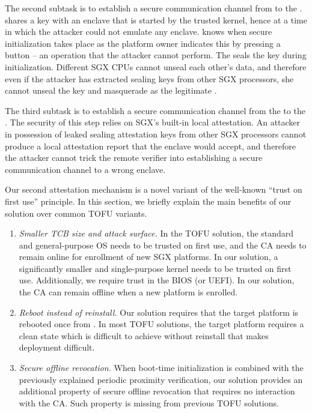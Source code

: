 The second subtask is to establish a secure communication channel from \device to the \nameclave. \device shares a key with an enclave that is started by the trusted \name kernel, hence at a time in which the attacker could not emulate any enclave. \device knows when secure initialization takes place as the platform owner indicates this by pressing a button -- an operation that the attacker cannot perform. The \nameclave seals the key during initialization. Different SGX CPUs cannot unseal each other's data, and therefore even if the attacker has extracted sealing keys from other SGX processors, she cannot unseal the key and masquerade as the legitimate \nameclave. 

The third subtask is to establish a secure communication channel from the \nameclave to the \app. The security of this step relies on SGX's built-in local attestation. An attacker in possession of leaked sealing attestation keys from other SGX processors cannot produce a local attestation report that the \name enclave would accept, and therefore the attacker cannot trick the remote verifier into establishing a secure communication channel to a wrong enclave.


 Our second attestation mechanism is a novel variant of the well-known ``trust on first use'' principle. In this section, we briefly explain the main benefits of our solution over common TOFU variants. 

\begin{enumerate}
\item \emph{Smaller TCB size and attack surface.} 
In the TOFU solution, the standard and general-purpose OS needs to be trusted on first use, and the CA needs to remain online for enrollment of new SGX platforms. In our solution, a significantly smaller and single-purpose kernel needs to be trusted on first use. Additionally, we require trust in the BIOS (or UEFI). In our solution, the CA can remain offline when a new platform is enrolled.


\item \emph{Reboot instead of reinstall.} Our solution requires that the target platform is rebooted once from \device. In most TOFU solutions, the target platform requires a clean state which is difficult to achieve without reinstall that makes deployment difficult.


\item \emph{Secure offline revocation.} When boot-time initialization is combined with the previously explained periodic proximity verification, our solution provides an additional property of secure offline revocation that requires no interaction with the CA. Such property is missing from previous TOFU solutions.

\end{enumerate}

